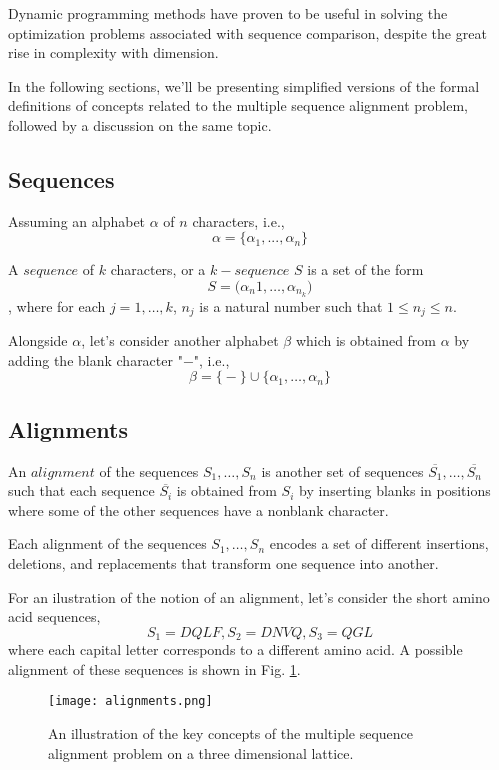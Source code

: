 \documentclass[11pt]{article}
\begin{document}
Dynamic programming methods have proven to be useful in solving the optimization problems associated with sequence comparison, despite the great rise in complexity with dimension. 

In the following sections, we'll be presenting simplified versions of the formal definitions of concepts related to the multiple sequence alignment problem, followed by a discussion on the same topic.

\subsection{Sequences}

Assuming an alphabet $\alpha$ of $n$ characters, i.e.,  $$\alpha = \big\{ \alpha_1, ... , \alpha_n \big\}$$

A $sequence$ of $k$ characters, or a $k-sequence$ $S$ is a set of the form $$S = \big( \alpha_n1, \dots , \alpha_n_k \big)$$, where for each $j = 1, \dots  , k$, $n_j$ is a natural number such that $1 \leq n_j \leq n$.

Alongside $\alpha$, let's consider another alphabet $\beta$ which is obtained from $\alpha$ by adding the blank character "$-$", i.e., $$\beta = \big\{ - \big\} \cup \big\{ \alpha_1, \dots , \alpha_n \big\}$$

\subsection{Alignments}

An $alignment$ of the sequences $S_1, \dots , S_n$ is another set of sequences $\overline{S_1}, \dots, \overline{S_n}$ such that each sequence $\overline{S_i}$ is obtained from $S_i$ by inserting blanks in positions where some of the other sequences have a nonblank character.

Each alignment of the sequences $S_1, \dots , S_n$ encodes a set of different insertions, deletions, and replacements that transform one sequence into another. 

For an ilustration of the notion of an alignment, let's consider the short amino acid sequences, $$S_1 = DQLF, S_2=DNVQ, S_3=QGL$$ where each capital letter corresponds to a different amino acid. A possible alignment of these sequences is shown in Fig. \ref{fig:alignment}.

\begin{figure}
    \centering
    \texttt{[image: alignments.png]}
    \caption{An illustration of the key concepts of the multiple sequence alignment problem on a three dimensional lattice.}
    \label{fig:alignment}
\end{figure}
\end{document}

